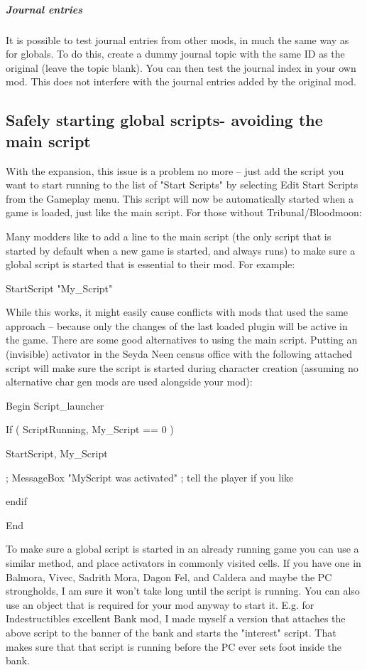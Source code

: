\documentclass[
]{article}
\begin{document}
\hypertarget{journal-entries}{%
\subparagraph{Journal entries}\label{journal-entries}}

It is possible to test journal entries from other mods, in much the same
way as for globals. To do this, create a dummy journal topic with the
same ID as the original (leave the topic blank). You can then test the
journal index in your own mod. This does not interfere with the journal
entries added by the original mod.

\hypertarget{safely-starting-global-scripts--avoiding-the-main-script}{%
\subsection{\texorpdfstring{\hfill\break
Safely starting global scripts- avoiding the main
script}{ Safely starting global scripts- avoiding the main script}}\label{safely-starting-global-scripts--avoiding-the-main-script}}

With the expansion, this issue is a problem no more -- just add the
script you want to start running to the list of "Start Scripts" by
selecting Edit Start Scripts from the Gameplay menu. This script will
now be automatically started when a game is loaded, just like the main
script. For those without Tribunal/Bloodmoon:

Many modders like to add a line to the main script (the only script that
is started by default when a new game is started, and always runs) to
make sure a global script is started that is essential to their mod. For
example:

StartScript "My\_Script"

While this works, it might easily cause conflicts with mods that used
the same approach -- because only the changes of the last loaded plugin
will be active in the game. There are some good alternatives to using
the main script. Putting an (invisible) activator in the Seyda Neen
census office with the following attached script will make sure the
script is started during character creation (assuming no alternative
char gen mods are used alongside your mod):

Begin Script\_launcher

If ( ScriptRunning, My\_Script == 0 )

StartScript, My\_Script

; MessageBox "MyScript was activated" ; tell the player if you like

endif

End

To make sure a global script is started in an already running game you
can use a similar method, and place activators in commonly visited
cells. If you have one in Balmora, Vivec, Sadrith Mora, Dagon Fel, and
Caldera and maybe the PC strongholds, I am sure it won't take long until
the script is running. You can also use an object that is required for
your mod anyway to start it. E.g. for Indestructibles excellent Bank
mod, I made myself a version that attaches the above script to the
banner of the bank and starts the "interest" script. That makes sure
that that script is running before the PC ever sets foot inside the
bank.
\end{document}

